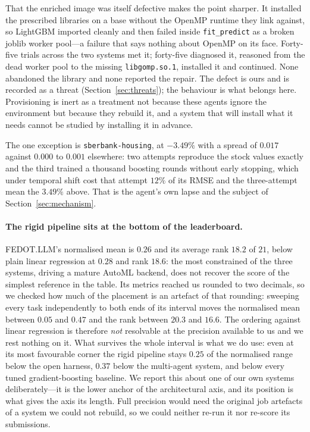 That the enriched image was itself defective makes the point sharper. It
installed the prescribed libraries on a base without the OpenMP runtime they link
against, so LightGBM imported cleanly and then failed inside
\texttt{fit\_predict} as a broken joblib worker pool---a failure that says
nothing about OpenMP on its face. Forty-five trials across the two systems met
it; forty-five diagnosed it, reasoned from the dead worker pool to the missing
\texttt{libgomp.so.1}, installed it and continued. None abandoned the library and
none reported the repair. The defect is ours and is recorded as a threat
(Section~\ref{sec:threats}); the behaviour is what belongs here. Provisioning is
inert as a treatment not because these agents ignore the environment but because
they rebuild it, and a system that will install what it needs cannot be studied
by installing it in advance.

The one exception is \texttt{sberbank-housing}, at $-3.49\%$ with a spread of
$0.017$ against $0.000$ to $0.001$ elsewhere: two attempts reproduce the stock
values exactly and the third trained a thousand boosting rounds without early
stopping, which under temporal shift cost that attempt $12\%$ of its RMSE and the
three-attempt mean the $3.49\%$ above. That is
the agent's own lapse and the subject of Section~\ref{sec:mechanism}.

\paragraph{The rigid pipeline sits at the bottom of the leaderboard.}
FEDOT.LLM's normalised mean is $0.26$ and its average rank $18.2$ of $21$, below
plain linear regression at $0.28$ and rank $18.6$: the most constrained of the
three systems, driving a mature AutoML backend, does not recover the score of the
simplest reference in the table. Its metrics reached us rounded to two decimals,
so we checked how much of the placement is an artefact of that rounding: sweeping
every task independently to both ends of its interval moves the normalised mean
between $0.05$ and $0.47$ and the rank between $20.3$ and $16.6$. The ordering
against linear regression is therefore \emph{not} resolvable at the precision
available to us and we rest nothing on it. What survives the whole interval is
what we do use: even at its most favourable corner the rigid pipeline stays
$0.25$ of the normalised range below the open harness, $0.37$ below the
multi-agent system, and below every tuned gradient-boosting baseline. We report
this about one of our own systems deliberately---it is the lower anchor of the
architectural axis, and its position is what gives the axis its length. Full
precision would need the original job artefacts of a system we could not rebuild,
so we could neither re-run it nor re-score its submissions.

